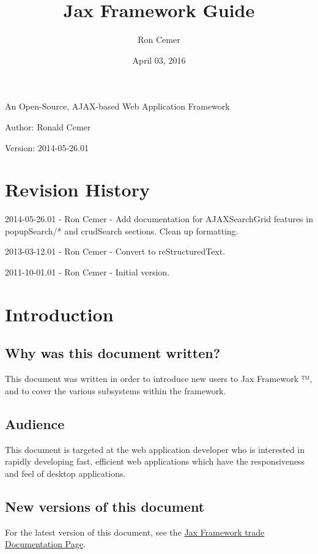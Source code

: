 \documentclass[letterpaper,10pt,english]{sphinxmanual}
\title{Jax Framework Guide}
\date{April 03, 2016}
\author{Ron Cemer}
\begin{document}
\maketitle
\tableofcontents
{}\label{jaxFrameworkGuide::doc}


An Open-Source, AJAX-based Web Application Framework

Author: Ronald Cemer

Version: 2014-05-26.01


\chapter{Revision History}
\label{jaxFrameworkGuide:jax-framework-trade}\label{jaxFrameworkGuide:revision-history}
2014-05-26.01 - Ron Cemer - Add documentation for AJAXSearchGrid features in popupSearch/* and crudSearch
sections.  Clean up formatting.

2013-03-12.01 - Ron Cemer - Convert to reStructuredText.

2011-10-01.01 - Ron Cemer - Initial version.


\chapter{Introduction}
\label{jaxFrameworkGuide:introduction}

\section{Why was this document written?}
\label{jaxFrameworkGuide:why-was-this-document-written}
This document was written in order to introduce new users to Jax Framework ™, and to cover the
various subsystems within the framework.


\section{Audience}
\label{jaxFrameworkGuide:audience}
This document is targeted at the web application developer who is interested in rapidly developing
fast, efficient web applications which have the responsiveness and feel of desktop applications.


\section{New versions of this document}
\label{jaxFrameworkGuide:new-versions-of-this-document}
For the latest version of this document, see the \href{http://jaxframework.org}{Jax Framework \textbar{}trade\textbar{} Documentation Page}.
\end{document}
